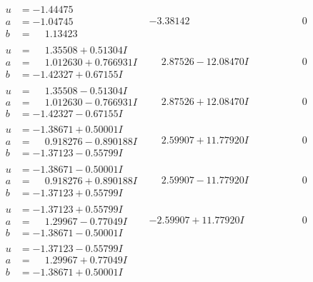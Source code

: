 \documentclass[1p]{elsarticle_modified}
\theoremstyle{definition}
\begin{document}
$$\begin{array}{c|c|c}
\begin{aligned}
u &= -1.44475\phantom{ +0.000000I} \\
a &= -1.04745\phantom{ +0.000000I} \\
b &= \phantom{-}1.13423\phantom{ +0.000000I}\end{aligned}
 & -3.38142\phantom{ +0.000000I} & \phantom{-0.000000 } 0 \\ \hline\begin{aligned}
u &= \phantom{-}1.35508 + 0.51304 I \\
a &= \phantom{-}1.012630 + 0.766931 I \\
b &= -1.42327 + 0.67155 I\end{aligned}
 & \phantom{-}2.87526 - 12.08470 I & \phantom{-0.000000 } 0 \\ \hline\begin{aligned}
u &= \phantom{-}1.35508 - 0.51304 I \\
a &= \phantom{-}1.012630 - 0.766931 I \\
b &= -1.42327 - 0.67155 I\end{aligned}
 & \phantom{-}2.87526 + 12.08470 I & \phantom{-0.000000 } 0 \\ \hline\begin{aligned}
u &= -1.38671 + 0.50001 I \\
a &= \phantom{-}0.918276 - 0.890188 I \\
b &= -1.37123 - 0.55799 I\end{aligned}
 & \phantom{-}2.59907 + 11.77920 I & \phantom{-0.000000 } 0 \\ \hline\begin{aligned}
u &= -1.38671 - 0.50001 I \\
a &= \phantom{-}0.918276 + 0.890188 I \\
b &= -1.37123 + 0.55799 I\end{aligned}
 & \phantom{-}2.59907 - 11.77920 I & \phantom{-0.000000 } 0 \\ \hline\begin{aligned}
u &= -1.37123 + 0.55799 I \\
a &= \phantom{-}1.29967 - 0.77049 I \\
b &= -1.38671 - 0.50001 I\end{aligned}
 & -2.59907 + 11.77920 I & \phantom{-0.000000 } 0 \\ \hline\begin{aligned}
u &= -1.37123 - 0.55799 I \\
a &= \phantom{-}1.29967 + 0.77049 I \\
b &= -1.38671 + 0.50001 I\end{aligned}

\end{array}$$
\end{document}
